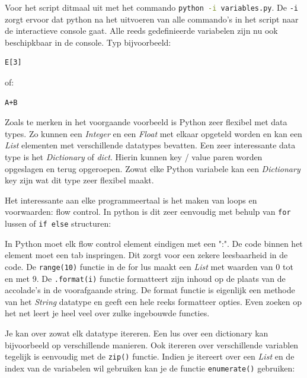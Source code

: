 \documentclass[11pt,twoside]{article}
\begin{document}
Voor het script ditmaal uit met het commando \lstinline[language=bash]{python -i variables.py}. De \lstinline[language=bash]{-i} zorgt ervoor dat python na het uitvoeren van alle commando's in het script naar de interactieve console gaat. Alle reeds gedefinieerde variabelen zijn nu ook beschipkbaar in de console. Typ bijvoorbeeld:
\begin{lstlisting}
E[3]
\end{lstlisting}
of:
\begin{lstlisting}
A+B
\end{lstlisting}

Zoals te merken in het voorgaande voorbeeld is Python zeer flexibel met data types. Zo kunnen een \emph{Integer} en een \emph{Float} met elkaar opgeteld worden en kan een \emph{List} elementen met verschillende datatypes bevatten. Een zeer interessante data type is het \emph{Dictionary} of \emph{dict}. Hierin kunnen key / value paren worden opgeslagen en terug opgeroepen. Zowat elke Python variabele kan een \emph{Dictionary} key zijn wat dit type zeer flexibel maakt.

Het interessante aan elke programmeertaal is het maken van loops en voorwaarden: flow control. In python is dit zeer eenvoudig met behulp van \lstinline{for} lussen of \lstinline{if else} structuren:


In Python moet elk flow control element eindigen met een ":". De code binnen het element moet een tab inspringen. Dit zorgt voor een zekere leesbaarheid in de code. De \lstinline{range(10)} functie in de for lus maakt een \emph{List} met waarden van 0 tot en met 9. De \lstinline{.format(i)} functie formatteert zijn inhoud op de plaats van de accolade's in de voorafgaande string. De format functie is eigenlijk een methode van het \emph{String} datatype en geeft een hele reeks formatteer opties. Even zoeken op het net leert je heel veel over zulke ingebouwde functies.

Je kan over zowat elk datatype itereren. Een lus over een dictionary kan bijvoorbeeld op verschillende manieren. Ook itereren over verschillende variablen tegelijk is eenvoudig met de \lstinline{zip()} functie. Indien je itereert over een \emph{List} en de index van de variabelen wil gebruiken kan je de functie \lstinline{enumerate()} gebruiken:

\end{document}
